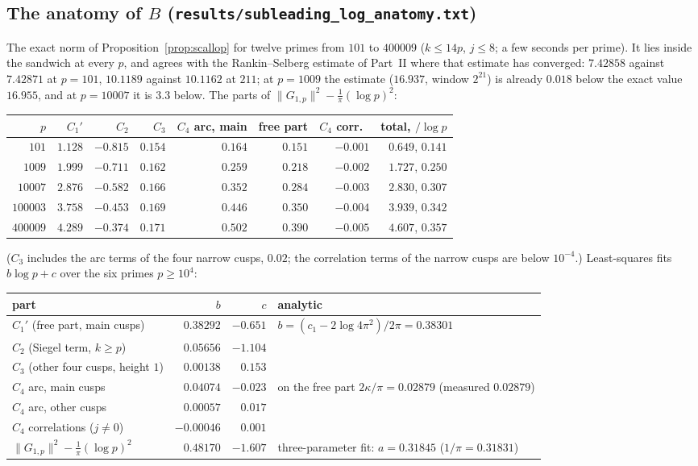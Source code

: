 \documentclass[11pt]{amsart}
\theoremstyle{remark}
\begin{document}
\subsection{The anatomy of $B$ (\texttt{results/subleading\_log\_anatomy.txt})}
The exact norm of Proposition~\ref{prop:scallop} for twelve primes from $101$ to $400009$ ($k\le14p$, $j\le8$; a few seconds per prime). It lies inside the sandwich at every $p$, and agrees with the Rankin--Selberg estimate of Part~II where that estimate has converged: $7.42858$ against $7.42871$ at $p=101$, $10.1189$ against $10.1162$ at $211$; at $p=1009$ the estimate ($16.937$, window $2^{21}$) is already $0.018$ below the exact value $16.955$, and at $p=10007$ it is $3.3$ below. The parts of $\|G_{1,p}\|^2-\frac1\pi(\log p)^2$:
\begin{center}\footnotesize\setlength{\tabcolsep}{3.5pt}
\begin{tabular}{r|rrrrrr|r}
\toprule
$p$ & $C_1'$ & $C_2$ & $C_3$ & $C_4$ arc, main & free part & $C_4$ corr.\ & total, $/\log p$\\
\midrule
$101$ & $1.128$ & $-0.815$ & $0.154$ & $0.164$ & $0.151$ & $-0.001$ & $0.649$, $0.141$\\
$1009$ & $1.999$ & $-0.711$ & $0.162$ & $0.259$ & $0.218$ & $-0.002$ & $1.727$, $0.250$\\
$10007$ & $2.876$ & $-0.582$ & $0.166$ & $0.352$ & $0.284$ & $-0.003$ & $2.830$, $0.307$\\
$100003$ & $3.758$ & $-0.453$ & $0.169$ & $0.446$ & $0.350$ & $-0.004$ & $3.939$, $0.342$\\
$400009$ & $4.289$ & $-0.374$ & $0.171$ & $0.502$ & $0.390$ & $-0.005$ & $4.607$, $0.357$\\
\bottomrule
\end{tabular}
\end{center}
($C_3$ includes the arc terms of the four narrow cusps, $0.02$; the correlation terms of the narrow cusps are below $10^{-4}$.) Least-squares fits $b\log p+c$ over the six primes $p\ge10^4$:
\begin{center}\footnotesize\setlength{\tabcolsep}{3.5pt}
\begin{tabular}{l|rr|l}
\toprule
part & $b$ & $c$ & analytic\\
\midrule
$C_1'$ (free part, main cusps) & $0.38292$ & $-0.651$ & $b=(c_1-2\log4\pi^2)/2\pi=0.38301$\\
$C_2$ (Siegel term, $k\ge p$) & $0.05656$ & $-1.104$ & \\
$C_3$ (other four cusps, height $1$) & $0.00138$ & $0.153$ & \\
$C_4$ arc, main cusps & $0.04074$ & $-0.023$ & on the free part $2\kappa/\pi=0.02879$ (measured $0.02879$)\\
$C_4$ arc, other cusps & $0.00057$ & $0.017$ & \\
$C_4$ correlations ($j\ne0$) & $-0.00046$ & $0.001$ & \\
\midrule
$\|G_{1,p}\|^2-\frac1\pi(\log p)^2$ & $0.48170$ & $-1.607$ & three-parameter fit: $a=0.31845$ ($1/\pi=0.31831$)\\
\bottomrule
\end{tabular}
\end{center}
\end{document}
